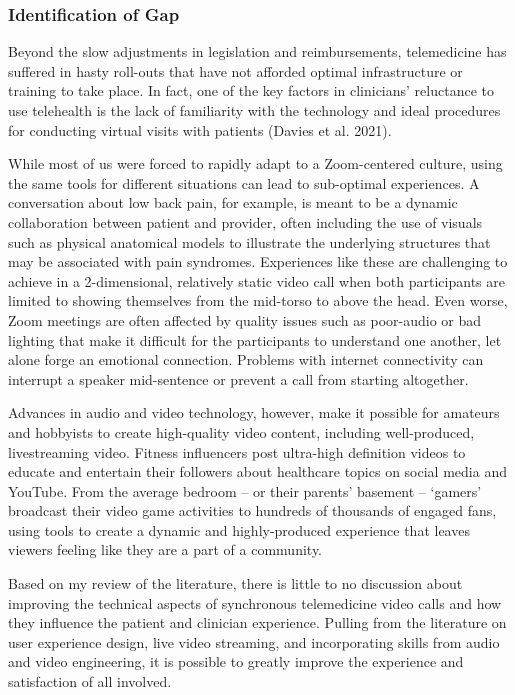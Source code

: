 \documentclass[
  letterpaper,
  DIV=11,
  numbers=noendperiod,
  oneside]{scrartcl}
\begin{document}
\subsubsection{Identification of Gap}\label{identification-of-gap}

Beyond the slow adjustments in legislation and reimbursements,
telemedicine has suffered in hasty roll-outs that have not afforded
optimal infrastructure or training to take place. In fact, one of the
key factors in clinicians' reluctance to use telehealth is the lack of
familiarity with the technology and ideal procedures for conducting
virtual visits with patients (Davies et al. 2021).

While most of us were forced to rapidly adapt to a Zoom-centered
culture, using the same tools for different situations can lead to
sub-optimal experiences. A conversation about low back pain, for
example, is meant to be a dynamic collaboration between patient and
provider, often including the use of visuals such as physical anatomical
models to illustrate the underlying structures that may be associated
with pain syndromes. Experiences like these are challenging to achieve
in a 2-dimensional, relatively static video call when both participants
are limited to showing themselves from the mid-torso to above the head.
Even worse, Zoom meetings are often affected by quality issues such as
poor-audio or bad lighting that make it difficult for the participants
to understand one another, let alone forge an emotional connection.
Problems with internet connectivity can interrupt a speaker mid-sentence
or prevent a call from starting altogether.

Advances in audio and video technology, however, make it possible for
amateurs and hobbyists to create high-quality video content, including
well-produced, livestreaming video. Fitness influencers post ultra-high
definition videos to educate and entertain their followers about
healthcare topics on social media and YouTube. From the average bedroom
-- or their parents' basement -- `gamers' broadcast their video game
activities to hundreds of thousands of engaged fans, using tools to
create a dynamic and highly-produced experience that leaves viewers
feeling like they are a part of a community.

Based on my review of the literature, there is little to no discussion
about improving the technical aspects of synchronous telemedicine video
calls and how they influence the patient and clinician experience.
Pulling from the literature on user experience design, live video
streaming, and incorporating skills from audio and video engineering, it
is possible to greatly improve the experience and satisfaction of all
involved.
\end{document}
